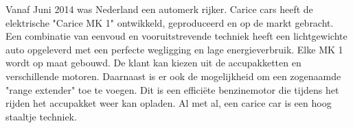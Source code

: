 Vanaf Juni 2014 was Nederland een automerk rijker. Carice cars heeft de elektrische "Carice MK 1" ontwikkeld, geproduceerd en op de markt gebracht. 
Een combinatie van eenvoud en vooruitstrevende techniek heeft een lichtgewichte auto opgeleverd met een perfecte wegligging en lage energieverbruik. 
\newline
Elke MK 1 wordt op maat gebouwd. De klant kan kiezen uit de accupakketten en verschillende motoren. Daarnaast is er ook de mogelijkheid om een zogenaamde "range extender" toe te voegen. Dit is een efficiëte benzinemotor die tijdens het rijden het accupakket weer kan opladen. 
\newline
Al met al, een carice car is een hoog staaltje techniek.